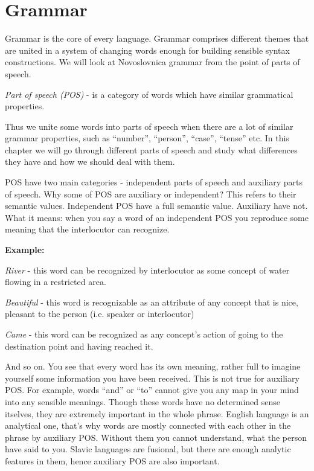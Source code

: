 \chapter{Grammar}

Grammar is the core of every language. Grammar comprises different themes that are united in a system of changing words enough for building sensible syntax constructions. We will look at Novoslovnica grammar from the point of parts of speech.

\textit{Part of speech (POS)} - is a category of words which have similar grammatical properties.

Thus we unite some words into parts of speech when there are a lot of similar grammar properties, such as “number”, “person”, “case”, “tense” etc. In this chapter we will go through different parts of speech and study what differences they have and how we should deal with them. 

POS have two main categories - independent parts of speech and auxiliary parts of speech. Why some of POS are auxiliary or independent? This refers to their semantic values. Independent POS have a full semantic value. Auxiliary have not. What it means: when you say a word of an independent POS you reproduce some meaning that the interlocutor can recognize.

\textbf{Example:}

\textit{River} - this word can be recognized by interlocutor as some concept of water flowing in a restricted area.

\textit{Beautiful} - this word is recognizable as an attribute of any concept that is nice, pleasant to the person (i.e. speaker or interlocutor)

\textit{Came} - this word can be recognized as any concept’s action of going to the destination point and having reached it. 

And so on. You see that every word has its own meaning, rather full to imagine yourself some information you have been received. This is not true for auxiliary POS. For example, words “and” or “to” cannot give you any map in your mind into any sensible meanings. Though these words have no determined sense itselves, they are extremely important in the whole phrase. English language is an analytical one, that’s why words are mostly connected with each other in the phrase by auxiliary POS. Without them you cannot understand, what the person have said to you. Slavic languages are fusional, but there are enough analytic features in them, hence auxiliary POS are also important.

